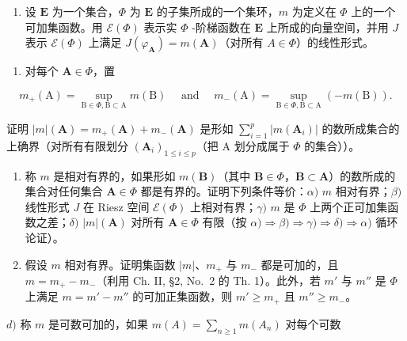 \exercisesection{}

\begin{enumerate}
\def\labelenumi{\arabic{enumi})}
\tightlist
\item
  设 \(\mathbf{E}\) 为一个集合，\(\Phi\) 为 \(\mathbf{E}\) 的子集所成的一个集环，\(m\) 为定义在 \(\Phi\) 上的一个可加集函数。用 \(\mathcal{E}(\Phi)\) 表示实 \(\Phi\) -阶梯函数在 \(\mathbf{E}\) 上所成的向量空间，并用 \(J\) 表示 \(\mathcal{E}(\Phi)\) 上满足 \(J(\varphi_{\mathbf{A}}) = m(\mathbf{A})\)（对所有 \(A \in \Phi\)）的线性形式。
\end{enumerate}

\begin{enumerate}
\def\labelenumi{\alph{enumi})}
\tightlist
\item
  对每个 \(\mathbf{A} \in \Phi\)，置
\end{enumerate}

\[
m _ {+} (\mathrm{A}) = \sup _ {\mathrm{B} \in \Phi , \mathrm{B} \subset \mathrm{A}} m (\mathrm{B}) \quad \text { and } \quad m _ {-} (\mathrm{A}) = \sup _ {\mathrm{B} \in \Phi , \mathrm{B} \subset \mathrm{A}} (- m (\mathrm{B})).
\]

证明 \(|m|(\mathbf{A}) = m_{+}(\mathbf{A}) + m_{-}(\mathbf{A})\) 是形如 \(\sum_{i=1}^{p}|m(\mathbf{A}_i)|\) 的数所成集合的上确界（对所有有限划分 \((\mathbf{A}_i)_{1\leqslant i\leqslant p}\)（把 A 划分成属于 \(\Phi\) 的集合））。

\begin{enumerate}
\def\labelenumi{\alph{enumi})}
\setcounter{enumi}{1}
\item
  称 \(m\) 是相对有界的，如果形如 \(m(\mathbf{B})\)（其中 \(\mathbf{B} \in \Phi\)，\(\mathbf{B} \subset \mathbf{A}\)）的数所成的集合对任何集合 \(\mathbf{A} \in \Phi\) 都是有界的。证明下列条件等价：\(\alpha)\) \(m\) 相对有界；\(\beta)\) 线性形式 \(J\) 在 Riesz 空间 \(\mathcal{E}(\Phi)\) 上相对有界；\(\gamma)\) \(m\) 是 \(\Phi\) 上两个正可加集函数之差；\(\delta)\) \(|m|(\mathbf{A})\) 对所有 \(\mathbf{A} \in \Phi\) 有限（按 \(\alpha) \Rightarrow \beta) \Rightarrow \gamma) \Rightarrow \delta) \Rightarrow \alpha)\) 循环论证）。
\item
  假设 \(m\) 相对有界。证明集函数 \(|m|\)、\(m_{+}\) 与 \(m_{-}\) 都是可加的，且 \(m = m_{+} - m_{-}\)（利用 Ch. II, §2, No.~2 的 Th. 1）。此外，若 \(m'\) 与 \(m''\) 是 \(\Phi\) 上满足 \(m = m' - m''\) 的可加正集函数，则 \(m' \geqslant m_{+}\) 且 \(m'' \geqslant m_{-}\)。
\end{enumerate}

\(d)\) 称 \(m\) 是可数可加的，如果 \(m(A) = \sum_{n\geqslant 1}m(A_n)\) 对每个可数

